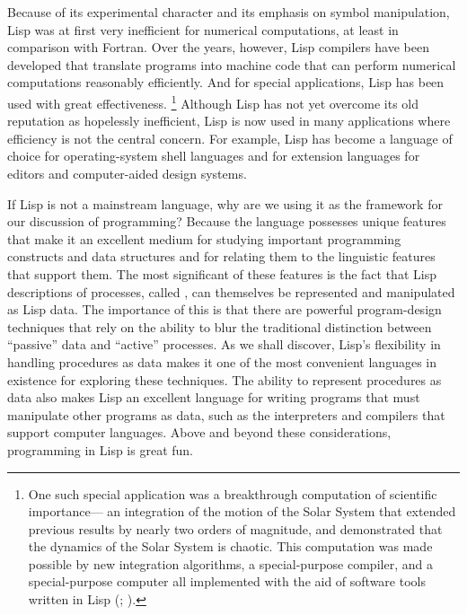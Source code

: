 Because of its experimental character and its emphasis on symbol manipulation, Lisp was at first very inefficient for numerical computations, at least in comparison with Fortran.
Over the years, however, Lisp compilers have been developed that translate programs into machine code that can perform numerical computations reasonably efficiently.
And for special applications, Lisp has been used with great effectiveness.%
\footnote{
	One such special application was a breakthrough computation of scientific importance---%
	an integration of the motion of the Solar System that extended previous results by nearly two orders of magnitude, and demonstrated that the dynamics of the Solar System is chaotic.
	This computation was made possible by new integration algorithms, a special-purpose compiler, and a special-purpose computer all implemented with the aid of software tools written in Lisp (; ).
}
Although Lisp has not yet overcome its old reputation as hopelessly inefficient, Lisp is now used in many applications where efficiency is not the central concern.
For example, Lisp has become a language of choice for operating-system shell languages and for extension languages for editors and computer-aided design systems.

If Lisp is not a mainstream language, why are we using it as the framework for our discussion of programming?
Because the language possesses unique features that make it an excellent medium for studying important programming constructs and data structures and for relating them to the linguistic features that support them.
The most significant of these features is the fact that Lisp descriptions of processes, called , can themselves be represented and manipulated as Lisp data.
The importance of this is that there are powerful program-design techniques that rely on the ability to blur the traditional distinction between “passive” data and “active” processes.
As we shall discover, Lisp’s flexibility in handling procedures as data makes it one of the most convenient languages in existence for exploring these techniques.
The ability to represent procedures as data also makes Lisp an excellent language for writing programs that must manipulate other programs as data, such as the interpreters and compilers that support computer languages.
Above and beyond these considerations, programming in Lisp is great fun.





